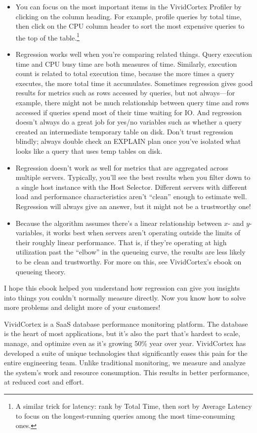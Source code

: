 \documentclass{vivid_layout}
\begin{document}
\begin{itemize}
\item You can focus on the most important items in the VividCortex
	Profiler by clicking on the column heading. For example,
	profile queries by total time, then click on the CPU
	column header to sort the most expensive queries to the top of the table.\footnote{A similar
	trick for latency: rank by Total Time, then sort by Average Latency
	to focus on the longest-running queries among the most
	time-consuming ones.}
\item Regression works well when you're
	comparing related things. Query execution
	time and CPU busy time are both measures of time.
	Similarly, execution count is related to total execution time, because
	the more times a query executes, the more total time it accumulates.
	Sometimes regression gives good results for metrics such as rows accessed by
	queries, but not always---for example, there might not be much relationship
	between query time and rows accessed if queries spend most of their time
	waiting for IO. And regression doesn't always do a
	great job for yes/no variables such as whether a query created an
	intermediate temporary table on disk. Don't
	trust regression blindly; always double check an EXPLAIN plan once you've
	isolated what looks like a query that uses temp tables on disk.
\item Regression doesn't work as well for metrics that are aggregated across
	multiple servers. Typically, you'll see the best results when you filter down
	to a single host instance with the Host Selector. Different servers with
	different load and performance characteristics aren't ``clean'' enough to
	estimate well. Regression will always give an answer, but it might not be a
	trustworthy one!
\item Because the algorithm assumes there's a linear relationship between $x$-
	and $y$-variables, it works best when servers aren't operating outside the
	limits of their roughly linear performance. That is, if they're operating at
	high utilization past the ``elbow'' in the queueing curve, the results are
	less likely to be clean and trustworthy. For more on this, see VividCortex's
	ebook on queueing theory.
\end{itemize}

I hope this ebook helped you understand how regression
can give you insights into things you couldn't normally measure directly. Now
you know how to solve more problems and delight more of your customers!

\newpage
\begin{about}	%
VividCortex is a SaaS database performance monitoring platform. The database is the heart of most applications, but it's also the part that's hardest to scale, manage, and optimize even as it's growing 50\% year over year. VividCortex has developed a suite of unique technologies that significantly eases this pain for the entire engineering team. Unlike traditional monitoring, we measure
and analyze the system's work and resource consumption. This results in better performance, at reduced cost and effort.
\end{about}
\makeresources	%
\end{document}
